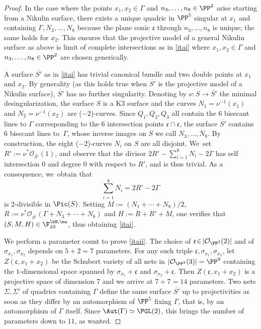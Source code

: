 \begin{proof}
In the case where the points $x_1,x_2\in \Gamma$ and $n_3,\ldots,n_8 \in \PP^2$ arise starting from a Nikulin surface, there exists a unique quadric in $\PP^5$ singular at $x_1$ and containing $\Gamma, N_3,\ldots,N_8$ because the plane conic $\mathfrak{c}$ through $n_3,\ldots,n_8$ is unique; the same holds for $x_2$. This ensures that the projective model of a general Nikulin surface as above is limit of complete intersections as in \eqref{itai} where $x_1,x_2\in \Gamma$ and $n_3,\ldots,n_8 \in \PP^2$ are chosen generically.

A surface $\overline{S'}$ as in \eqref{itai} has trivial canonical bundle and two double points at $x_1$ and $x_2$. By generality (as this holds true when $\overline{S'}$ is the projective model of a Nikulin surface), $\overline{S'}$ has no further singularity. Denoting by $\nu:S\to \overline{S'}$ the minimal desingularization, the surface $S$ is a K3 surface and the curves $N_1=\nu^{-1}(x_1)$ and $N_2=\nu^{-1}(x_2)$ are ($-2$)-curves. Since $Q_1,Q_2,Q_3$ all contain the $6$ bisecant lines to $\Gamma$ corresponding to the $6$ intersection points $\mathfrak{c}\cap \mathfrak{e}$, the surface $\overline{S'}$ contains $6$ bisecant lines to~$\Gamma$, whose \hbox{inverse} images on $S$ we call $N_3,\ldots,N_8$. By construction, the eight ($-2$)\nobreakdash-curves $N_i$ on $S$ are all disjoint. We~set $R':=\nu^*\mathcal{O}_{\overline{S'}}(1)$, and observe that the divisor
$2R'-\sum_{i=1}^8N_i-2\Gamma$
has self intersection $0$ and degree $0$ with respect to $R'$, and is thus trivial. As a consequence, we~obtain that
\[
\sum_{i=1}^8N_i=2R'-2\Gamma
\]
is $2$-divisible in $\Pic(S)$. Setting $M:=(N_1+\cdots + N_8)/2$, $R:=\nu^*\mathcal{O}_{\overline{S'}}(\Gamma+N_3+\cdots+N_8)$ and $H:=R+R'+M$, one verifies that $(S,M,H)\in \F_{23}^{\bN,\ns}$, thus obtaining \eqref{itai}.

We perform a parameter count to prove \eqref{itaii}. The choice of $\mathfrak{c}\!\in\! |\mathcal O_{\PP^2}(2)|$ and of $\sigma_{x_1},\sigma_{x_2}$ depends on $5+2\!=\!7$ parameters. For any such triple $\mathfrak{c}, \sigma_{x_1},\sigma_{x_2}$, let \hbox{$Z(\mathfrak{c}, x_1\!+\!x_2)$} be the Schubert variety of all nets in $|\mathcal O_{\PP^2}(3)|=\PP^9$ containing the $1$-dimensional space spanned by $\sigma_{x_1}+\mathfrak{c}$ and $\sigma_{x_2}+\mathfrak{c}$. Then $Z(\mathfrak{c}, x_1+x_2)$ is a projective space of dimension $7$ and we arrive at $7+7=14$ parameters. Two nets $\Sigma,\Sigma'$ of quadrics containing $\Gamma$ define the same surface $\overline{S'}$ up to projectivities as soon as they differ by an automorphism of $\PP^5$ fixing $\Gamma$, that is, by an automorphism of $\Gamma$ itself. Since $\Aut(\Gamma)\simeq \PGL(2)$, this brings the number of parameters down to $11$, as wanted.
\end{proof}

